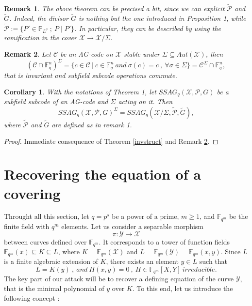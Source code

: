 \documentclass[10pt]{article}
\newtheorem{coro1}{Corollary}[]
\newtheorem{rq1}{Remark}[]
\newcommand{\s}{\vspace{0.3cm}}
\newcommand{\fqm}{\mathbb{F}_{q^m}}
\newcommand{\fq}{\mathbb{F}_q}
\newcommand{\su}{\subseteq}
\newcommand{\X}{\mathcal{X}}
\newcommand{\Y}{\mathcal{Y}}
\newcommand{\PR}{\mathcal{P}}
\begin{document}
\s


\begin{rq1} \rm
The above theorem can be precised a bit, since we can explicit $\tilde{\PR}$ and $\tilde{G}$. Indeed, the divisor $\tilde{G}$ is nothing but the one introduced in Proposition 1, while $\tilde{\PR} := \{P' \in \mathbb{P}_{L^{\sigma}} \ ; \ P \mid P'\}$. In particular, they can be described by using the ramification in the cover $\X \rightarrow \X/\Sigma$.
\end{rq1}

\s

\begin{rq1} \rm \label{commute}
Let $\mathcal{C}$ be an AG-code on $\X$ stable under $\Sigma \su Aut(\X)$, then
\[(\mathcal{C}\cap \fq^n)^{\Sigma} = \{c \in \mathcal{C} \ | \ c \in \fq^n \ and \ \sigma(c)=c \ , \ \forall \sigma \in \Sigma\} = \mathcal{C}^{\Sigma} \cap \fq^n,\]
that is invariant and subfield subcode operations commute.
\end{rq1}

\s

\begin{coro1} \label{ssag}
With the notations of Theorem 1, let $SSAG_q(\X,\PR,G)$ be a subfield subcode of an AG-code and $\Sigma$ acting on it. Then 
\[SSAG_q(\X,\PR,G)^{\Sigma} = SSAG_q(\X/\Sigma,\tilde{\PR},\tilde{G}),\]
where $\tilde{\PR}$ and $\tilde{G}$ are defined as in remark 1.
\end{coro1}

\s

\begin{proof}
Immediate consequence of Theorem \ref{invstruct} and Remark \ref{commute}.
\end{proof}

\s

\section{Recovering the equation of a covering}


\s

Throught all this section, let $q=p^s$ be a power of a prime, $m \geq 1$, and $\fqm$ be the finite field with $q^m$ elements. Let us consider a separable morphism 
\[\pi : \Y \rightarrow \X\]
between curves defined over $\fqm$. It corresponds to a tower of function fields $\fqm(x) \su K \su L$, where $K=\fqm(\X)$ and $L=\fqm(\Y)=\fqm(x,y)$. Since $L$ is a finite  algebraic extension of $K$, there exists an element $y \in L$ such that 
\[L = K(y) \ , \ and \ H(x,y)=0 \ , \ H \in \fqm[X,Y] \ irreducible.\]
The key part of our attack will be to recover a defining equation of the curve $\Y$, that is the minimal polynomial of $y$ over $K$. To this end, let us introduce the following concept :
\end{document}
